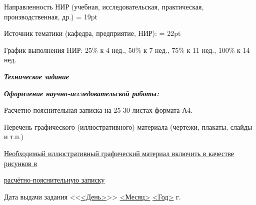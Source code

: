 \documentclass[utf8x, 12pt, oneside, a4paper]{article}
\begin{document}
	\begin{flushleft}
		Направленность НИР (учебная, исследовательская, практическая, производственная, др.) \baselineskip = 19pt
		\\ \uline{ \hfill}
	\end{flushleft}

	\begin{flushleft}
		Источник тематики (кафедра, предприятие, НИР): \uline{\hfill} \baselineskip = 22pt
	\end{flushleft}

	\begin{flushleft}
		График выполнения НИР:  25\% к 4 нед., 50\% к 7 нед., 75\% к 11 нед., 100\% к 14 нед.
	\end{flushleft}

	\begin{flushleft}
		\textbf{\textit{Техническое задание}} \uline{\hfill} %
		
		\uline{\hfill}
		
		\uline{\hfill}

		\uline{\hfill}

		\uline{\hfill}
	\end{flushleft}

	\begin{flushleft}
		\textbf{\textit{Оформление научно-исследовательской работы:}}
		
		Расчетно-пояснительная записка на 25-30 %
		листах формата А4.

		Перечень графического (иллюстративного) материала (чертежи, плакаты, слайды и т.п.)
		
		\uline{Необходимый иллюстративный графический материал включить в качестве рисунков в \hfill}

		\uline{расчётно-пояснительную записку\hfill}
	\end{flushleft}

	\begin{flushleft}
		Дата выдачи задания <<\uline{<День>}>> \uline{<Месяц>} \uline{<Год>} г. %
	\end{flushleft}
\end{document}

